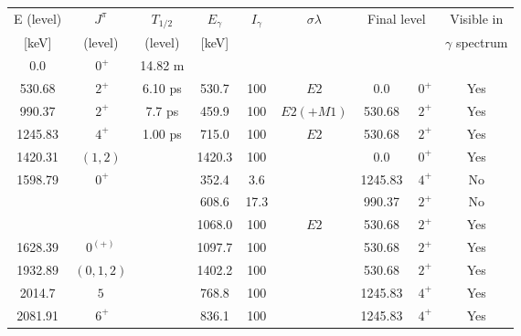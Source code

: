 \begin{tabular}{ccccccccc}
\hline
E (level) & $J^\pi$   & $T_{1/2}$  & $E_\gamma$ & $I_\gamma$ & $\sigma \lambda$ & \multicolumn{2}{c}{Final level} & Visible in        \\
{[keV]}   & (level)   & (level)    & [keV]      &            &                  &                 &               & $\gamma$ spectrum \\
\hline
0.0       & $~0^+$    &   14.82 m  &            &            &                  &                 &                &                   \\
530.68    & $~2^+$    &    6.10 ps &  530.7     & 100        & $E2$             &    0.0          & $~0^+$         & Yes               \\
990.37    & $~2^+$    &    7.7 ps  &  459.9     & 100        & $E2(+M1)$        &  530.68         & $~2^+$         & Yes               \\
1245.83   & $~4^+$    &    1.00 ps &  715.0     & 100        & $E2$             &  530.68         & $~2^+$         & Yes               \\
1420.31   & $(1,2)$   &            & 1420.3     & 100        &                  &    0.0          & $~0^+$         & Yes               \\
1598.79   & $~0^+$    &            &  352.4     &   3.6      &                  & 1245.83         & $~4^+$         & No                \\
          &           &            &  608.6     &  17.3      &                  &  990.37         & $~2^+$         & No                \\
          &           &            & 1068.0     & 100        & $E2$             &  530.68         & $~2^+$         & Yes               \\
1628.39   & $0^{(+)}$ &            & 1097.7     & 100        &                  &  530.68         & $~2^+$         & Yes               \\
1932.89   & $(0,1,2)$ &            & 1402.2     & 100        &                  &  530.68         & $~2^+$         & Yes               \\
2014.7    & $5$       &            &  768.8     & 100        &                  & 1245.83         & $~4^+$         & Yes               \\
2081.91   & $~6^+$    &            &  836.1     & 100        &                  & 1245.83         & $~4^+$         & Yes               \\

\end{tabular}

